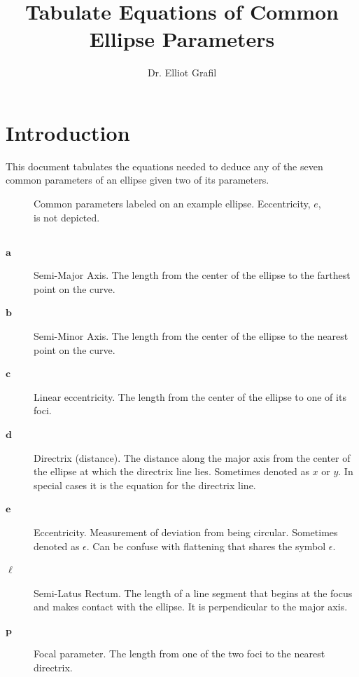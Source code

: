 \documentclass{article}
\title{\vspace{-2.5cm}Tabulate Equations of Common Ellipse Parameters}
\author{Dr. Elliot Grafil}
\begin{document}
\maketitle
\section*{Introduction}
This document tabulates the equations needed to deduce any of the seven common parameters of an ellipse given two of its parameters. 
\begin{figure}[H]
\begin{center}
\noindent{}
  \caption{Common parameters labeled on an example ellipse. Eccentricity, $e$, is not depicted.}
  \label{fig:boat1}
  \end{center}
\end{figure}
\subsection*{}
\begin{description}
\item[$\boldsymbol{a}$] Semi-Major Axis. The length from the center of the ellipse to the farthest point on the curve.
\item[$\boldsymbol{b}$] Semi-Minor Axis. The length from the center of the ellipse to the nearest point on the curve.
\item[$\boldsymbol{c}$] Linear eccentricity. The length from the center of the ellipse to one of its foci.
\item[$\boldsymbol{d}$] Directrix (distance). The distance along the major axis from the center of the ellipse at which the directrix line lies. Sometimes denoted as $x$ or $y$. In special cases it is the equation for the directrix line.
\item[$\boldsymbol{e}$] Eccentricity. Measurement of deviation from being circular. Sometimes denoted as $\epsilon$. Can be confuse with flattening that shares the symbol $\epsilon$.
\item[$\boldsymbol{\ell}$] Semi-Latus Rectum. The length of a line segment that begins at the focus and makes contact with the ellipse. It is perpendicular to the major axis.
\item[$\boldsymbol{p}$] Focal parameter. The length from one of the two foci to the nearest directrix.
\end{description}
\end{document}
